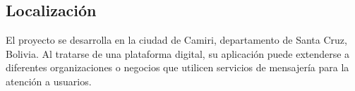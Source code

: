 \subsection{Localización }
El proyecto se desarrolla en la ciudad de Camiri, departamento de Santa Cruz, Bolivia. Al tratarse de una plataforma digital, su aplicación puede extenderse a diferentes organizaciones o negocios que utilicen servicios de mensajería para la atención a usuarios.
